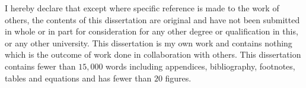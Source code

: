 
\begin{declaration}

I hereby declare that except where specific reference is made to the work of 
others, the contents of this dissertation are original and have not been 
submitted in whole or in part for consideration for any other degree or 
qualification in this, or any other university. This dissertation is my own 
work and contains nothing which is the outcome of work done in collaboration 
with others. This dissertation contains fewer than $15,000$ words including appendices, 
bibliography, footnotes, tables and equations and has fewer than  $20$ figures.

\vspace{5em}



\end{declaration}


